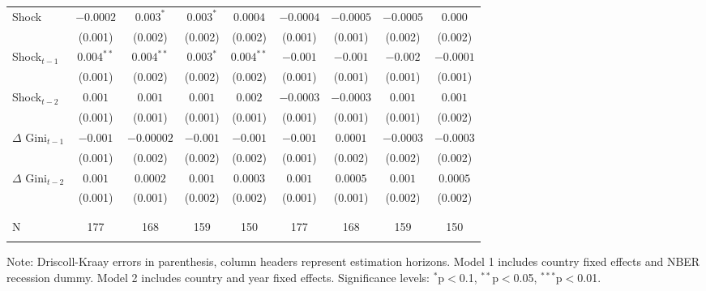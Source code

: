\documentclass[12pt, a4paper]{article}
\begin{document}
\begin{table}[!htbp]
{\begin{tabular}{@{\extracolsep{5pt}}l cccccccc}
Shock & $-0.0002$ & $0.003^{*}$ & $0.003^{*}$ & $0.0004$ & $-0.0004$ & $-0.0005$ & $-0.0005$ & $0.000$ \\
 & (0.001) & (0.002) & (0.002) & (0.002) & (0.001) & (0.001) & (0.002) & (0.002) \\ [0.5em]
 
Shock$_{t-1}$  & $0.004^{**}$ & $0.004^{**}$ & $0.003^{*}$ & $0.004^{**}$ & $-0.001$ & $-0.001$ & $-0.002$ & $-0.0001$ \\
 & (0.001) & (0.002) & (0.002) & (0.002) & (0.001) & (0.001) & (0.001) & (0.001) \\ [0.5em]
 
Shock$_{t-2}$ & $0.001$ & $0.001$ & $0.001$ & $0.002$ & $-0.0003$ & $-0.0003$ & $0.001$ & $0.001$ \\
& (0.001) & (0.001) & (0.001) & (0.001) & (0.001) & (0.001) & (0.001) & (0.002) \\ [0.5em]

$\Delta$ Gini$_{t-1}$ & $-0.001$ & $-0.00002$ & $-0.001$ & $-0.001$ & $-0.001$ & $0.0001$ & $-0.0003$ & $-0.0003$ \\ 
  & (0.001) & (0.002) & (0.002) & (0.002) & (0.001) & (0.002) & (0.002) & (0.002) \\  [0.5em]

$\Delta$ Gini$_{t-2}$ & $0.001$ & $0.0002$ & $0.001$ & $0.0003$ & $0.001$ & $0.0005$ & $0.001$ & $0.0005$ \\ 
  & (0.001) & (0.001) & (0.002) & (0.002) & (0.001) & (0.001) & (0.002) & (0.002) \\  [1em]
\\[-1.8ex] \hline \\[-1.8ex] 
N & 177 & 168 & 159 & 150 & 177 & 168 & 159 & 150 \\ 
\hline \\[-1.8ex]
\end{tabular}
}
\begin{minipage}{\textwidth}
    \vspace{0.1cm} 
    \footnotesize  Note: Driscoll-Kraay errors in parenthesis, column headers represent estimation horizons. Model 1 includes country fixed effects and NBER recession dummy. Model 2 includes country and year fixed effects. Significance levels: $^{*}$p$<$0.1, $^{**}$p$<$0.05, $^{***}$p$<$0.01.
\end{minipage}
\end{table}
\newpage
\end{document}
